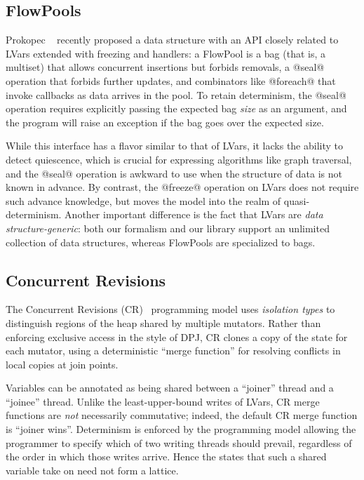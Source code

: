\documentclass{article}
\begin{document}
\subsection{FlowPools}

Prokopec \etal~\cite{flowpools} recently proposed a data structure
with an API closely related to LVars extended with freezing and
handlers: a FlowPool is a bag (that is, a multiset) that allows
concurrent insertions but forbids removals, a @seal@ operation that
forbids further updates, and combinators like @foreach@ that invoke
callbacks as data arrives in the pool.  To retain determinism, the
@seal@ operation requires explicitly passing the expected bag
\emph{size} as an argument, and the program will raise an exception if
the bag goes over the expected size.

While this interface has a flavor similar to that of LVars, it lacks
the ability to detect quiescence, which is crucial for expressing
algorithms like graph traversal, and the @seal@ operation is awkward
to use when the structure of data is not known in advance.  By
contrast, the @freeze@ operation on LVars does not require such
advance knowledge, but moves the model into the realm of
quasi-determinism.  Another important difference is the fact that
LVars are \emph{data structure-generic}: both our formalism and our
library support an unlimited collection of data structures, whereas
FlowPools are specialized to bags.

\subsection{Concurrent Revisions}

The Concurrent Revisions (CR)~\cite{concurrent-revisions-haskell11}
programming model uses \emph{isolation types} \cite{isolation-types}
to distinguish regions of the heap shared by multiple mutators.
Rather than enforcing exclusive access in the style of DPJ, CR clones
a copy of the state for each mutator, using a deterministic ``merge
function'' for resolving conflicts in local copies at join points.

Variables can be annotated as being shared between a ``joiner'' thread
and a ``joinee'' thread.  Unlike the least-upper-bound writes of
LVars, CR merge functions are \emph{not} necessarily commutative;
indeed, the default CR merge function is ``joiner wins''.  Determinism
is enforced by the programming model allowing the programmer to
specify which of two writing threads should prevail, regardless of the
order in which those writes arrive.  Hence the states that such a
shared variable take on need not form a lattice.
\end{document}
